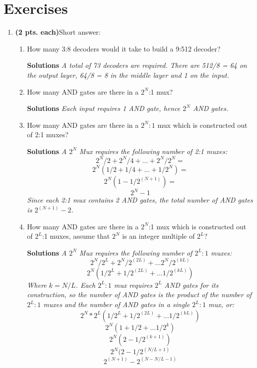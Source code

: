 \section{Exercises}
\label{section:comboBbExercises}
\graphicspath{ {./chapter04/FigHw} }


\begin{enumerate}
\item \textbf{ (2 pts. each)}Short answer:
\begin{enumerate}
        \item How many 3:8 decoders would it take to build a 9:512 decoder?

	\begin{onlysolution} \textbf{Solutions} \itshape{A total of 73 decoders are required.  There are 512/8 = 64 on
	the output layer, 64/8 = 8 in the middle layer and 1 on the input.}\end{onlysolution} 
        \item How many AND gates are there in a $2^N$:1 mux?

	\begin{onlysolution} \textbf{Solutions} \itshape{ Each input requires 1 AND gate, hence $2^N$ AND gates.} \end{onlysolution} 
        \item How many AND gates are there in a $2^N:1$ mux which is
                constructed out of 2:1 muxes?

	\begin{onlysolution} \textbf{Solutions} \itshape{ A $2^N$ Mux requires the following number of 2:1 muxes: 
        $$ 2^N/2 + 2^N/4 + ... + 2^N/2^N = $$
        $$ 2^N(1/2 + 1/4 + ... + 1/2^N) = $$
        $$ 2^N(1-1/2^(N+1)) =  $$
        $$ 2^N - 1  $$
	Since each 2:1 mux contains 2 AND gates, the total number of AND gates is
	$2^(N+1) - 2$.
	} \end{onlysolution} 

        \item How many AND gates are there in a $2^N$:1 mux which is
                constructed out of $2^L$:1 muxes, assume that
                $2^N$ is an integer multiple of $2^L$?

	\begin{onlysolution} \textbf{Solutions} \itshape{
	A $2^N$ Mux requires the following number of $2^L:1$ muxes:
        $$ 2^N/2^L + 2^N/2^(2L) + ... 2^N/2^(kL) $$
        $$ 2^N(1/2^L + 1/2^(2L) + ... 1/2^(kL)) $$
	Where $k = N/L$.  Each $2^L:1$ mux requires $2^L$ AND gates for its construction,
	so the number of AND gates is the product of the number of $2^L:1$ muxes and the
	number of AND gates in a single $2^L:1$ mux, or:
        $$ 2^N * 2^L(1/2^L + 1/2^(2L) + ... 1/2^(kL)) $$
        $$ 2^N (1 + 1/2 + ... 1/2^k) $$
        $$ 2^N (2-1/2^(k+1)) $$
        $$ 2^N (2-1/2^(N/L+1) $$
        $$ 2^(N+1) - 2^(N-N/L-1) $$
	} \end{onlysolution} 


\end{enumerate}
\end{enumerate}
